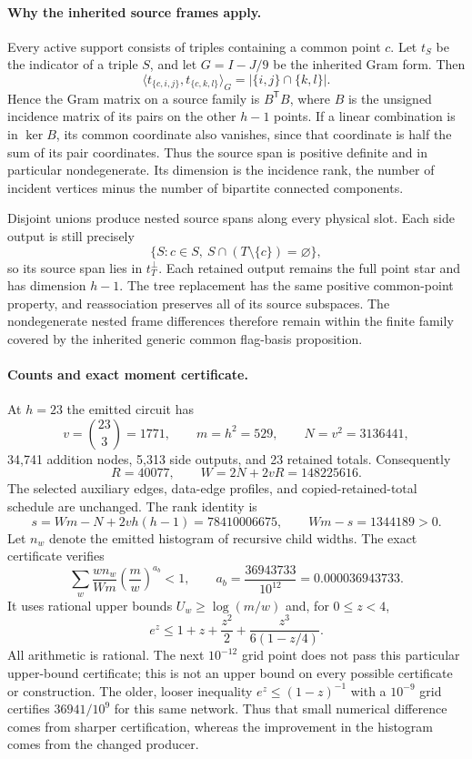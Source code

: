 \documentclass[11pt]{article}
\begin{document}
\paragraph{Why the inherited source frames apply.}
Every active support consists of triples containing a common point $c$.
Let $t_S$ be the indicator of a triple $S$, and let $G=I-J/9$ be the inherited
Gram form. Then
\[
 \langle t_{\{c,i,j\}},t_{\{c,k,l\}}\rangle_G
 =|\{i,j\}\cap\{k,l\}|.
\]
Hence the Gram matrix on a source family is $B^{\mathsf T}B$, where $B$ is the
unsigned incidence matrix of its pairs on the other $h-1$ points. If a linear
combination is in $\ker B$, its common coordinate also vanishes, since that
coordinate is half the sum of its pair coordinates. Thus the source span is
positive definite and in particular nondegenerate. Its dimension is the
incidence rank, the number of incident vertices minus the number of bipartite
connected components.

Disjoint unions produce nested source spans along every physical slot. Each
side output is still precisely
\[
 \{S:c\in S,\ S\cap(T\setminus\{c\})=\varnothing\},
\]
so its source span lies in $t_T^\perp$. Each retained output remains the full
point star and has dimension $h-1$. The tree replacement has the same positive
common-point property, and reassociation preserves all of its source subspaces.
The nondegenerate nested frame differences therefore remain within the finite
family covered by the inherited generic common flag-basis proposition.

\paragraph{Counts and exact moment certificate.}
At $h=23$ the emitted circuit has
\[
 v=\binom{23}{3}=1771,\qquad m=h^2=529,\qquad N=v^2=3136441,
\]
34,741 addition nodes, 5,313 side outputs, and 23 retained totals. Consequently
\[
 R=40077,\qquad W=2N+2vR=148225616.
\]
The selected auxiliary edges, data-edge profiles, and copied-retained-total
schedule are unchanged. The rank identity is
\[
 s=Wm-N+2vh(h-1)=78410006675,
 \qquad Wm-s=1344189>0.
\]
Let $n_w$ denote the emitted histogram of recursive child widths. The exact
certificate verifies
\[
 \sum_w\frac{w n_w}{Wm}\left(\frac mw\right)^{a_b}<1,
 \qquad a_b=\frac{36943733}{10^{12}}=0.000036943733.
\]
It uses rational upper bounds $U_w\ge\log(m/w)$ and, for $0\le z<4$,
\[
 e^z\le 1+z+\frac{z^2}{2}+\frac{z^3}{6(1-z/4)}.
\]
All arithmetic is rational. The next $10^{-12}$ grid point does not pass this
particular upper-bound certificate; this is not an upper bound on every possible
certificate or construction. The older, looser inequality
$e^z\le(1-z)^{-1}$ with a $10^{-9}$ grid certifies $36941/10^9$ for this same
network. Thus that small numerical difference comes from sharper certification,
whereas the improvement in the histogram comes from the changed producer.
\end{document}
